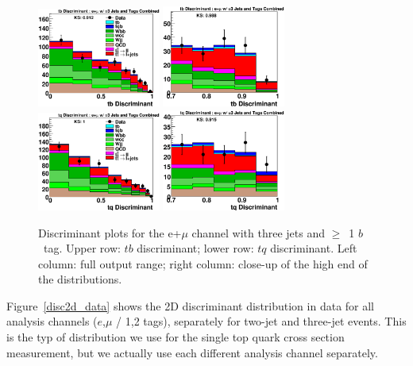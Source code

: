 \vspace{-0.05in}
\begin{figure}[!h!tbp]
\includegraphics[width=0.36\textwidth]
{figures/output/3jet/All_tb_Discriminant.eps}
\includegraphics[width=0.36\textwidth]
{figures/output/3jet/All_tb_Discriminant_Zoom.eps}
\includegraphics[width=0.36\textwidth]
{figures/output/3jet/All_tq_Discriminant.eps}
\includegraphics[width=0.36\textwidth]
{figures/output/3jet/All_tq_Discriminant_Zoom.eps}
\vspace{-0.1in}
\caption{Discriminant plots for the e+$\mu$ channel with three jets
and $\geq$~1 $b$~tag. Upper row: $tb$ discriminant; lower row: $tq$
discriminant. Left column: full output range; right column: close-up
of the high end of the distributions.}
\label{e21_3j}
\end{figure}

\clearpage

Figure~\ref{disc2d_data} shows the 2D discriminant distribution in
data for all analysis channels ($e$,$\mu$ / 1,2 tags), separately for
two-jet and three-jet events. This is the typ of distribution we use
for the single top quark cross section measurement, but we actually
use each different analysis channel separately.

